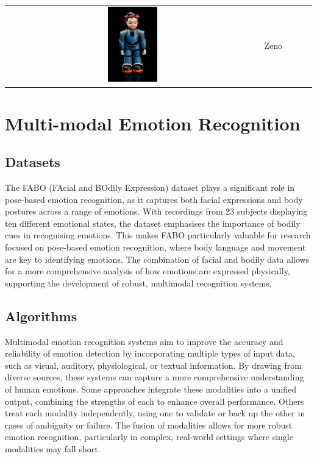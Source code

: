 \begin{table}[ht]
{\begin{tabularx}{1.3\textwidth}{ c|X|X|c|c|}
\cline{2-5}
\includegraphics[width=0.2\textwidth]{robot_table/Zeno.png} & Zeno    & & & \cite{8578328}  \\
\cline{2-5}
\end{tabularx}
}
\end{table}
\clearpage{}

\section{Multi-modal Emotion Recognition}

\subsection{Datasets}

The FABO (FAcial and BOdily Expression) dataset \cite{1699093} plays a significant role in pose-based emotion recognition, as it captures both facial expressions and body postures across a range of emotions. With recordings from 23 subjects displaying ten different emotional states, the dataset emphasises the importance of bodily cues in recognising emotions. This makes FABO particularly valuable for research focused on pose-based emotion recognition, where body language and movement are key to identifying emotions. The combination of facial and bodily data allows for a more comprehensive analysis of how emotions are expressed physically, supporting the development of robust, multimodal recognition systems.

\subsection{Algorithms}

Multimodal emotion recognition systems aim to improve the accuracy and reliability of emotion detection by incorporating multiple types of input data, such as visual, auditory, physiological, or textual information. By drawing from diverse sources, these systems can capture a more comprehensive understanding of human emotions. Some approaches integrate these modalities into a unified output, combining the strengths of each to enhance overall performance. Others treat each modality independently, using one to validate or back up the other in cases of ambiguity or failure. The fusion of modalities allows for more robust emotion recognition, particularly in complex, real-world settings where single modalities may fall short.

